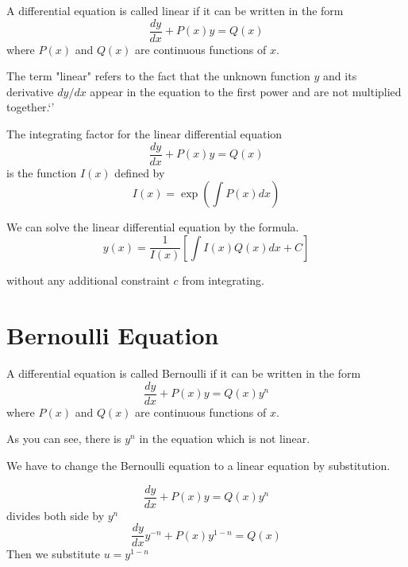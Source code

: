 \begin{definition}
  A differential equation is called linear if it can be written in the form
  \[
    \frac{dy}{dx} + P(x)y = Q(x)
  \]
  where \(P(x)\) and \(Q(x)\) are continuous functions of \(x\).

\end{definition}

The term "linear" refers to the fact that the unknown function \(y\) and its derivative \(dy/dx\) appear in the equation to the first power and are not multiplied together.`'

\begin{definition}
  The integrating factor for the linear differential equation
  \[
    \frac{dy}{dx} + P(x)y = Q(x)
  \]
  is the function \(I(x)\) defined by
  \[
    I(x) = \exp(\int P(x)dx)
  \]
\end{definition}

We can solve the linear differential equation by the formula.
\[
  y(x) = \frac{1}{I(x)}[\int I(x)Q(x)dx + C]
\]

without any additional constraint \(c\) from integrating.

\section{Bernoulli Equation}

\begin{definition}
  A differential equation is called Bernoulli if it can be written in the form
  \[
    \frac{dy}{dx} + P(x)y = Q(x)y^n
  \]
  where \(P(x)\) and \(Q(x)\) are continuous functions of \(x\).
\end{definition}

As you can see, there is $y^n$ in the equation which is not linear.

We have to change the Bernoulli equation to a linear equation by substitution.

\[
  \frac{dy}{dx} + P(x)y = Q(x)y^n
\]
divides both side by $y^n$
\[
  \frac{dy}{dx}y^{-n} + P(x)y^{1-n} = Q(x)
\]
Then we substitute $u = y^{1-n}$

